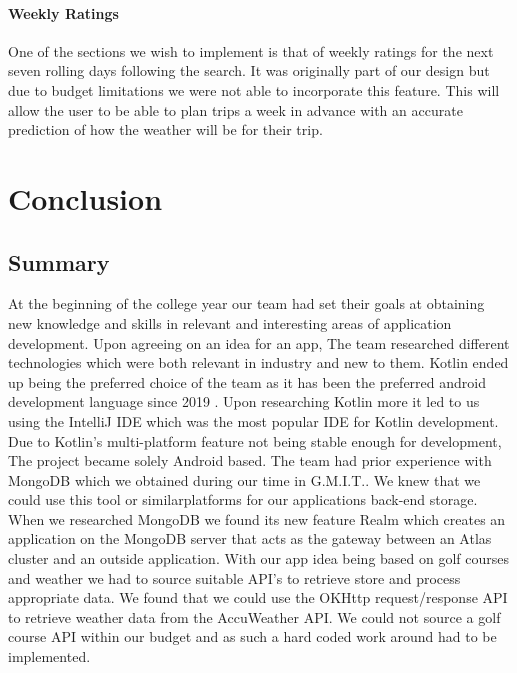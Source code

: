 \subsubsection{Weekly Ratings}
One of the sections we wish to implement is that of weekly ratings for the next seven rolling days following the search. It was originally part of our design but due to budget limitations we were not able to incorporate this feature. This will allow the user to be able to plan trips a week in advance with an accurate prediction of how the weather will be for their trip.

\chapter{Conclusion}
\section{Summary}
At the beginning of the college year our team had set their goals at obtaining new knowledge and skills in relevant and interesting areas of application development. Upon agreeing on an idea for an app, The team researched different technologies which were both relevant in industry and new to them. Kotlin ended up being the preferred choice of the team as it has been the preferred android development language since 2019 \cite{ref3}\cite{ref18}. 
\newline
\newline
Upon researching Kotlin more it led to us using the IntelliJ IDE which was the most popular IDE for Kotlin development. Due to Kotlin's multi-platform feature not being stable enough for development, The project became solely Android based.\cite{ref2}
\newline
\newline
The team had prior experience with MongoDB which we obtained during our time in G.M.I.T.. We knew that we could use this tool or similar\newline platforms for our applications back-end storage.
\newline
\newline
When we researched  MongoDB we found its new feature Realm which creates an application on the MongoDB server that acts as the gateway between an Atlas cluster and an outside application.
\newline
\newline
With our app idea being based on golf courses and weather we had to source suitable API's to retrieve store and process appropriate data. We found that we could use the OKHttp request/response API\cite{ref1} to retrieve weather data from the AccuWeather API. We could not source a golf course API within our budget and as such a hard coded work around had to be implemented.
\newline

